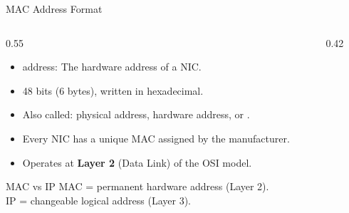 \documentclass[aspectratio=169]{beamer}  %
\begin{document}
\begin{frame}{MAC Address Format}
    \begin{columns}[T]
        \begin{column}{0.55\textwidth}
            \begin{itemize}
                \item {} address: The hardware address of a NIC.
                \item 48 bits (6 bytes), written in hexadecimal.
                \item Also called: physical address, hardware address, or .
                \item Every NIC has a unique MAC assigned by the manufacturer.
                \item Operates at \textbf{Layer 2} (Data Link) of the OSI model.
            \end{itemize}
            
            \vspace{0.3em}
            \begin{alertblock}{MAC vs IP}
                MAC = permanent hardware address (Layer 2). \\
                IP = changeable logical address (Layer 3).
            \end{alertblock}
        \end{column}
        \begin{column}{0.42\textwidth}
            \begin{center}
            \end{center}


\end{column}
\end{columns}
\end{frame}
\end{document}
